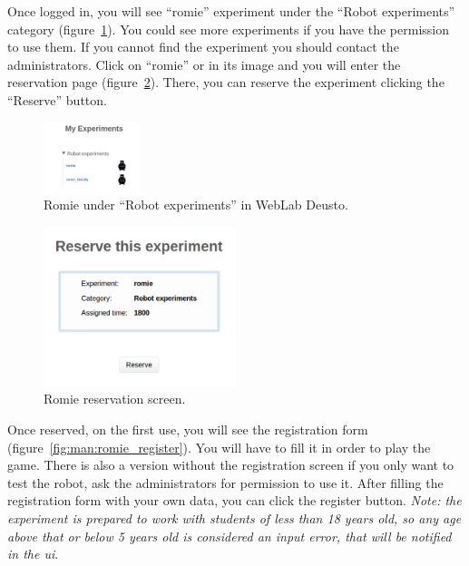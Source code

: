 Once logged in, you will see ``romie'' experiment under the ``Robot experiments'' category
(figure~\ref{fig:man:romie_weblab}). You could see more experiments if you have the permission to
use them. If you cannot find the experiment you should contact the administrators. Click on
``romie'' or in its image and you will enter the reservation page
(figure~\ref{fig:man:romie_reserve}). There, you can reserve the experiment clicking the ``Reserve''
button.

\begin{figure}[!htbp]
	\centering
	\includegraphics[width=0.25\textwidth]{fig/manuals/romie-weblab}
	\caption{Romie under ``Robot experiments'' in WebLab Deusto.}
	\label{fig:man:romie_weblab}
\end{figure}

\begin{figure}[!htbp]
	\centering
	\includegraphics[width=0.5\textwidth]{fig/manuals/trivial/romie-reserve}
	\caption{Romie reservation screen.}
	\label{fig:man:romie_reserve}
\end{figure}

Once reserved, on the first use, you will see the registration form
(figure~\ref{fig:man:romie_register}). You will have to fill it in order to play the game. There is
also a version without the registration screen if you only want to test the robot, ask the
administrators for permission to use it. After filling the registration form  with your own data,
you can click the register button. \emph{Note: the experiment is prepared to work with students of
less than 18 years old, so any age above that or below 5 years old is considered an input error,
that will be notified in the \acrlong{ui}}.

